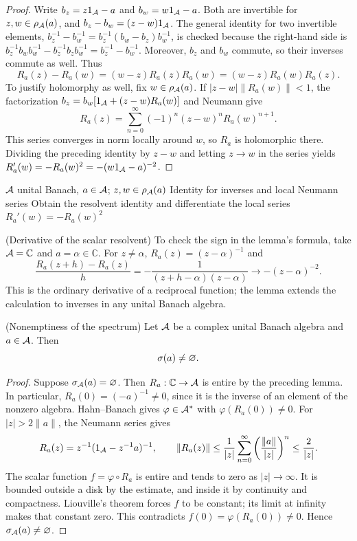 \begin{proof}[Proof]
Write $b_z=z1_\mathcal A-a$ and $b_w=w1_\mathcal A-a$. Both are invertible
for $z,w\in\rho_\mathcal A(a)$, and $b_z-b_w=(z-w)1_\mathcal A$.
The general identity for two invertible elements,
$b_z^{-1}-b_w^{-1}=b_z^{-1}(b_w-b_z)b_w^{-1}$,
is checked because the right-hand side is
$b_z^{-1}b_wb_w^{-1}-b_z^{-1}b_zb_w^{-1}
=b_z^{-1}-b_w^{-1}$. Moreover, $b_z$
and $b_w$ commute, so their inverses commute as well. Thus
\[
 R_a(z)-R_a(w)=(w-z)R_a(z)R_a(w)
                =(w-z)R_a(w)R_a(z).
\]
To justify holomorphy as well, fix $w\in\rho_\mathcal A(a)$.
If $|z-w|\|R_a(w)\|<1$, the factorization
$b_z=b_w[1_\mathcal A+(z-w)R_a(w)]$ and Neumann give
\[
 R_a(z)=\sum_{n=0}^{\infty}(-1)^n(z-w)^nR_a(w)^{n+1}.
\]
This series converges in norm locally around $w$, so $R_a$
is holomorphic there. Dividing the preceding identity by $z-w$ and letting
$z\to w$ in the series yields
$R_a'(w)=-R_a(w)^2=-(w1_\mathcal A-a)^{-2}$.
\end{proof}

\proofdiagram
{$\mathcal A$ unital Banach, $a\in\mathcal A$; $z,w\in\rho_\mathcal A(a)$}
{Identity for inverses and local Neumann series}
{Obtain the resolvent identity and differentiate the local series}
{$R_a'(w)=-R_a(w)^2$}

\begin{cthejemplo}{(Derivative of the scalar resolvent)}
To check the sign in the lemma's formula, take
$\mathcal A=\mathbb C$ and $a=\alpha\in\mathbb C$.
For $z\ne\alpha$, $R_a(z)=(z-\alpha)^{-1}$ and
\[
 \frac{R_a(z+h)-R_a(z)}{h}
 =-\frac{1}{(z+h-\alpha)(z-\alpha)}
 \longrightarrow -(z-\alpha)^{-2}.
\]
This is the ordinary derivative of a reciprocal function; the lemma extends
the calculation to inverses in any unital Banach algebra.
\end{cthejemplo}

\begin{cthteorema}{(Nonemptiness of the spectrum)}
Let $\mathcal A$ be a complex unital Banach algebra and $a\in\mathcal A$. Then
\[
 \sigma(a)\neq\varnothing.
\]
\end{cthteorema}

\begin{proof}[Proof]
Suppose $\sigma_\mathcal A(a)=\varnothing$. Then
$R_a:\mathbb C\to\mathcal A$ is entire by the preceding lemma. In particular,
$R_a(0)=(-a)^{-1}\ne0$, since it is the inverse of an element of the
nonzero algebra. Hahn--Banach gives
$\varphi\in\mathcal A^*$ with $\varphi(R_a(0))\ne0$.
For $|z|>2\|a\|$, the Neumann series gives
\[
 R_a(z)=z^{-1}(1_\mathcal A-z^{-1}a)^{-1},\qquad
 \|R_a(z)\|\le\frac{1}{|z|}
 \sum_{n=0}^{\infty}\left(\frac{\|a\|}{|z|}\right)^n
 \le\frac{2}{|z|}.
\]
The scalar function $f=\varphi\circ R_a$ is entire and tends to zero
as $|z|\to\infty$. It is bounded outside a disk by the estimate,
and inside it by continuity and compactness. Liouville's theorem forces
$f$ to be constant; its limit at infinity makes that constant zero.
This contradicts $f(0)=\varphi(R_a(0))\ne0$. Hence
$\sigma_\mathcal A(a)\ne\varnothing$.
\end{proof}

